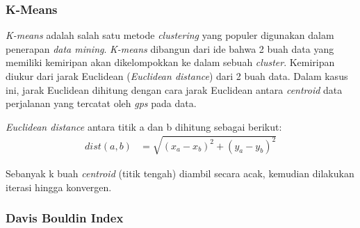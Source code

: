 \documentclass{article}
\begin{document}
\subsubsection{K-Means}
\begin{adjustwidth}{4em}{0pt}

\hspace{\parindent}\textit{K-means} adalah salah satu metode \textit{clustering} yang populer digunakan dalam penerapan \textit{data mining}. \textit{K-means} dibangun dari ide bahwa 2 buah data yang memiliki kemiripan akan dikelompokkan ke dalam sebuah \textit{cluster}. Kemiripan diukur dari jarak Euclidean (\textit{Euclidean distance}) dari 2 buah data. Dalam kasus ini, jarak Euclidean dihitung dengan cara jarak Euclidean antara \textit{centroid} data perjalanan yang tercatat oleh \textit{gps} pada data.

\textit{Euclidean distance} antara titik a dan b dihitung sebagai berikut:
\begin{align*}
	dist(a,b) &= \sqrt{(x_{a} - x_{b})^2 + (y_{a} - y_{b})^2}
\end{align*}

Sebanyak k buah \textit{centroid} (titik tengah) diambil secara acak, kemudian dilakukan iterasi hingga konvergen. 

\end{adjustwidth}

\subsubsection{Davis Bouldin Index}
\end{document}
